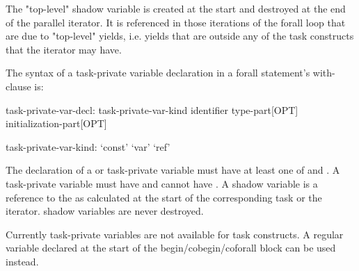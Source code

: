 The "top-level" shadow variable is created at the start and destroyed
at the end of the parallel iterator. It is referenced in those iterations
of the forall loop that are due to "top-level" yields, i.e. yields
that are outside any of the task constructs that the iterator may have.

The syntax of a task-private variable declaration in a forall statement's
with-clause is:

\begin{syntax}
task-private-var-decl:
  task-private-var-kind identifier type-part[OPT] initialization-part[OPT]

task-private-var-kind:
  `const'
  `var'
  `ref'
\end{syntax}

The declaration of a  or  task-private variable must
have at least one of  and .
A  task-private variable must have 
and cannot have . A  shadow variable
is a reference to the  as calculated at
the start of the corresponding task or the iterator.
 shadow variables are never destroyed.

\begin{craychapel}
Currently task-private variables are not available for task constructs.
A regular variable declared at the start of the begin/cobegin/coforall
block can be used instead.
\end{craychapel}

